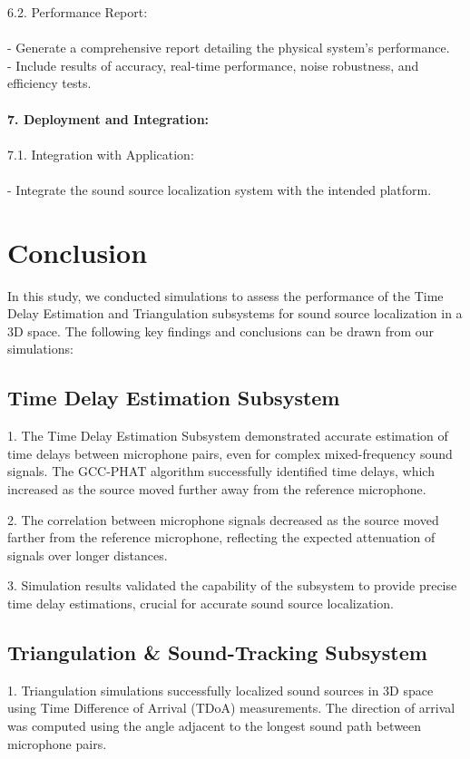 \documentclass[a4paper,11pt]{article}
\newcommand{\mysection}[2]{\setcounter{section}{#1}\addtocounter{section}{-1}\section{#2}}
\begin{document}
6.2. Performance Report: \\\\
- Generate a comprehensive report detailing the physical system's performance. \\
- Include results of accuracy, real-time performance, noise robustness, and efficiency tests. \\\\
\textbf{7. Deployment and Integration:} \\\\
7.1. Integration with Application: \\\\
- Integrate the sound source localization system with the intended platform. 

\mysection{7}{Conclusion}

In this study, we conducted simulations to assess the performance of the Time Delay Estimation and Triangulation subsystems for sound source localization in a 3D space. The following key findings and conclusions can be drawn from our simulations:

\subsection{Time Delay Estimation Subsystem}

1. The Time Delay Estimation Subsystem demonstrated accurate estimation of time delays between microphone pairs, even for complex mixed-frequency sound signals. The GCC-PHAT algorithm successfully identified time delays, which increased as the source moved further away from the reference microphone.

2. The correlation between microphone signals decreased as the source moved farther from the reference microphone, reflecting the expected attenuation of signals over longer distances.

3. Simulation results validated the capability of the subsystem to provide precise time delay estimations, crucial for accurate sound source localization.

\subsection{Triangulation \& Sound-Tracking Subsystem}

1. Triangulation simulations successfully localized sound sources in 3D space using Time Difference of Arrival (TDoA) measurements. The direction of arrival was computed using the angle adjacent to the longest sound path between microphone pairs.
\end{document}
